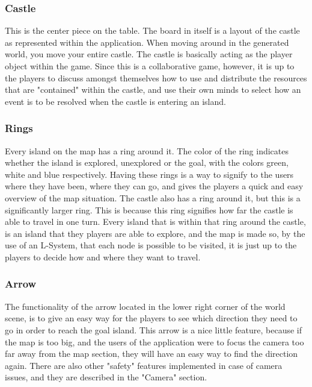 \subsubsection{Castle}
	
This is the center piece on the table. The board in itself is a layout of the castle as represented within the application.
When moving around in the generated world, you move your entire castle. The castle is basically acting as the player object within the game. Since this is a collaborative game, however, it is up to the players to discuss amongst themselves how to use and distribute the resources that are "contained" within the castle, and use their own minds to select how an event is to be resolved when the castle is entering an island.

\subsubsection{Rings} 

Every island on the map has a ring around it. The color of the ring indicates whether the island is explored, unexplored or the goal, with the colors green, white and blue respectively. Having these rings is a way to signify to the users where they have been, where they can go, and gives the players a quick and easy overview of the map situation.
The castle also has a ring around it, but this is a significantly larger ring. This is because this ring signifies how far the castle is able to travel in one turn. Every island that is within that ring around the castle, is an island that they players are able to explore, and the map is made so, by the use of an L-System, that each node is possible to be visited, it is just up to the players to decide how and where they want to travel.

\subsubsection{Arrow} 

The functionality of the arrow located in the lower right corner of the world scene, is to give an easy way for the players to see which direction they need to go in order to reach the goal island.
This arrow is a nice little feature, because if the map is too big, and the users of the application were to focus the camera too far away from the map section, they will have an easy way to find the direction again. There are also other "safety" features implemented in case of camera issues, and they are described in the "Camera" section.


